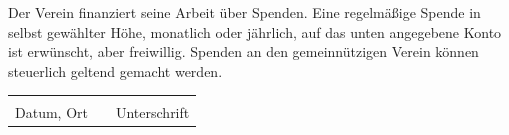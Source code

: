\documentclass[a4paper,DIV=10,12pt]{scrartcl}
\newcommand{\feld}{\strut\hrulefill}
\begin{document}
Der Verein finanziert seine Arbeit über Spenden. Eine regelmäßige Spende in selbst gewählter Höhe, monatlich oder jährlich, auf das unten angegebene Konto ist erwünscht, aber freiwillig. Spenden an den gemeinnützigen Verein können steuerlich geltend gemacht werden.

\vspace{2em}

\begin{tabular}{@{}p{}p{}p{}@{}}
	\feld & & \feld \\
	Datum, Ort & & Unterschrift \\
\end{tabular}
\end{document}
